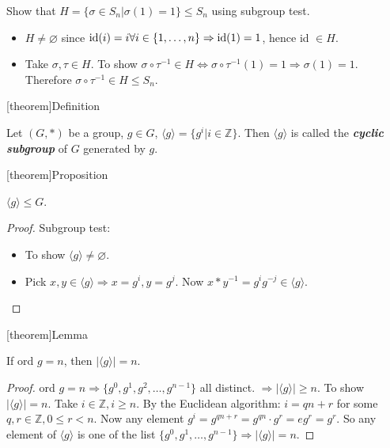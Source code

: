 \documentclass[12pt]{report}
\theoremstyle{definition}
\begin{document}
\begin{ex}
    Show that $H = \{\sigma \in S_n | \sigma(1) = 1 \} \le S_n$ using subgroup test.
    \begin{itemize}
        \item $H \neq \varnothing$ since $\textnormal{id}(i) = i \forall i \in
            \{1, \ldots, n\} \Rightarrow{} \textnormal{id}(1) = 1$, hence id $\in H$.
        \item Take $\sigma, \tau \in H$. To show $\sigma \circ \tau^{-1} \in H
            \iff \sigma \circ \tau^{-1}(1) = 1 \Rightarrow{} \sigma(1) = 1$.
            Therefore $\sigma \circ \tau^{-1} \in H \le S_n$.
    \end{itemize}
\end{ex}

[theorem]{Definition}
\begin{cyclic subgroup}
    Let $(G, *)$ be a group, $g \in G$, $\langle g\rangle = \{g^{i} | i \in \mathbb{Z}\}$.
    Then $\langle g \rangle$ is called the \textbf{\emph{cyclic subgroup}} of $G$ generated by $g$.
\end{cyclic subgroup}

[theorem]{Proposition}
\begin{cyclic subgroup prop}
    $\langle g \rangle \le G$.
\end{cyclic subgroup prop}

\begin{proof}
    Subgroup test: 
    \begin{itemize}
            \item To show $\langle g\rangle  \neq \varnothing$.
            \item Pick $x,y \in \langle g\rangle  \Rightarrow{} x = g^{i}, y = g^{j}$.
                Now $x * y^{-1} = g^{i}g^{-j} \in \langle g\rangle $.
    \end{itemize}
\end{proof}

[theorem]{Lemma}
\begin{ord of cyclic subgroup}
    If ord $g = n$, then $|\langle g\rangle | = n$.
\end{ord of cyclic subgroup}

\begin{proof}
    ord $g = n \Rightarrow{} \{g^{0}, g^{1}, g^{2}, \ldots, g^{n-1}\}$ all distinct.
    $\Rightarrow{} |\langle g\rangle | \ge n$.
    To show $|\langle g\rangle | = n$. Take $i \in \mathbb{Z}, i \ge n$.
    By the Euclidean algorithm: $i = qn + r$ for some $q, r \in \mathbb{Z}, 0 \le r < n$.
    Now any element $g^{i} = g^{qn + r} = g^{qn} \cdot g^{r} = e g^{r} = g^{r}$.
    So any element of $\langle g\rangle $ is one of the list $\{g^{0}, g^{1}, \ldots, g^{n - 1}\} \Rightarrow{}
    |\langle g\rangle | = n$.
\end{proof}
\end{document}

